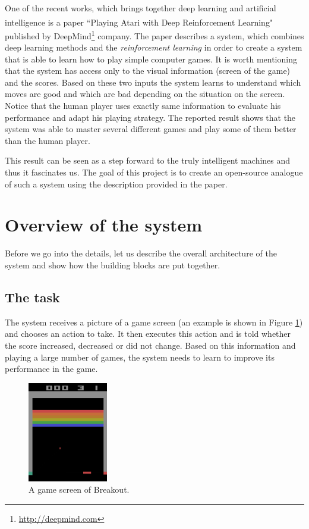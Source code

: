 \documentclass[a4paper,12pt]{article}
\begin{document}
One of the recent works, which brings together deep learning and artificial intelligence is a paper ``Playing Atari with Deep Reinforcement Learning"\textsuperscript{\cite{mnih2013playing}} published by DeepMind\footnote{\url{http://deepmind.com}} company. The paper describes a system, which combines deep learning methods and the \emph{reinforcement learning} in order to create a system that is able to learn how to play simple computer games. It is worth mentioning that the system has access only to the visual information (screen of the game) and the scores. Based on these two inputs the system learns to understand which moves are good and which are bad depending on the situation on the screen. Notice that the human player uses exactly same information to evaluate his performance and adapt his playing strategy. The reported result shows that the system was able to master several different games and play some of them better than the human player.

This result can be seen as a step forward to the truly intelligent machines and thus it fascinates us. The goal of this project is to create an open-source analogue of such a system using the description provided in the paper.



%
%
\pagebreak
\section{Overview of the system}
Before we go into the details, let us describe the overall architecture of the system and show how the building blocks are put together. 

\subsection{The task}

The system receives a picture of a game screen (an example is shown in Figure \ref{fig:breakoutscreen}) and chooses an action to take. It then executes this action and is told whether the score increased, decreased or did not change. Based on this information and playing a large number of games, the system needs to learn to improve its performance in the game.

\begin{figure}[h]
\centering
\includegraphics[width=3.5cm]{fig_gamescreen}
\caption{A game screen of Breakout.}
\label{fig:breakoutscreen}
\end{figure}
\end{document}
